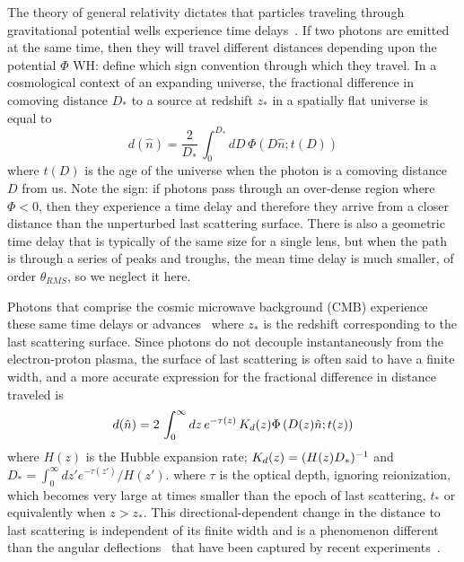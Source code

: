 \documentclass[prl,amsmath,amssymb,floatfix,superscriptaddress,nofootinbib,twocolumn]{revtex4-1}
\def\be{\begin{equation}}
\def\ee{\end{equation}}
\newcommand{\wh}[1]{{\color{red} WH: #1}}
\begin{document}
The theory of general relativity dictates that particles traveling through gravitational potential wells experience time delays~\cite{1964PhRvL..13..789S}. If two photons are emitted at the same time, then they will travel different distances depending upon the potential $\Phi$ \wh{define which sign convention} through which they travel. In a cosmological context of an expanding universe, the %
fractional difference in comoving distance
$D_*$ to a source at redshift $z_*$ in a spatially flat universe is equal to
\be
d(\hat n) = \frac{2}{D_*}\, \int_0^{D_*} dD\, \Phi\left(D \hat n; t(D)\right)
\ee
where %
$t(D)$ is the age of the universe when the photon is a comoving distance $D$ from us. Note the sign: if photons pass through an over-dense region where $\Phi<0$, then they experience a time delay and therefore they arrive from a closer distance than the unperturbed last scattering surface. There is also a geometric time delay that is typically of the same size for a single lens, but when the path is through a series of peaks and troughs, the mean time delay is much smaller, of order $\theta_{RMS}$, so we neglect it here. 

Photons that comprise the cosmic microwave background (CMB) experience these same time delays or advances~\cite{Hu:2001yq} where $z_*$ is the redshift corresponding to the last scattering surface. Since photons do not decouple instantaneously from the electron-proton plasma, the surface of last scattering is often said to have a finite width, and a more accurate expression for the fractional difference in distance traveled is
\be
\fd(\hat n) = 2\, \int_0^{\infty} dz \, e^{-\tau(z)}\, K_\fd(z)\Phi\left(D(z)\hat n; t(z)\right)
\ee
where $H(z)$ is the Hubble expansion rate; $K_d(z) =  (H(z)D_*)^{-1}$ and $D_* =  \int_0^\infty dz' e^{-\tau(z') }/H(z')$.
where $\tau$ is the optical depth, ignoring reionization, which becomes very large at times smaller than the epoch of  last scattering, $t_*$ or equivalently when $z>z_*$.
This directional-dependent change in the distance to last scattering is independent of its finite width and is a phenomenon different than the angular deflections~\cite{Hu:2001tn,Lewis:2006fu} that have been captured by recent experiments~\cite{Smith:2007rg,Ade:2013tyw,Story:2014hni,Sherwin:2016tyf,Aghanim:2018oex}.
\end{document}
